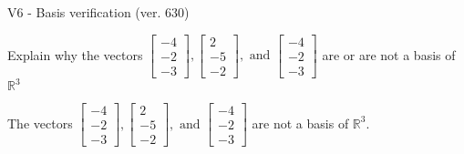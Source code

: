 \begin{exercise}
  \begin{exerciseTitle}V6 - Basis verification (ver. 630)\end{exerciseTitle}
  \begin{exerciseStatement}
    Explain why the vectors \(\left[\begin{array}{r}
-4 \\
-2 \\
-3
\end{array}\right] , \left[\begin{array}{r}
2 \\
-5 \\
-2
\end{array}\right] , \text{ and } \left[\begin{array}{r}
-4 \\
-2 \\
-3
\end{array}\right]\) are or are not a basis of \(\mathbb{R}^3\)	


  \end{exerciseStatement}
  \begin{exerciseAnswer}
   The vectors \(\left[\begin{array}{r}
-4 \\
-2 \\
-3
\end{array}\right] , \left[\begin{array}{r}
2 \\
-5 \\
-2
\end{array}\right] , \text{ and } \left[\begin{array}{r}
-4 \\
-2 \\
-3
\end{array}\right]\) 
  	 are not  a basis of \(\mathbb{R}^3\).
  


  \end{exerciseAnswer}
\end{exercise}